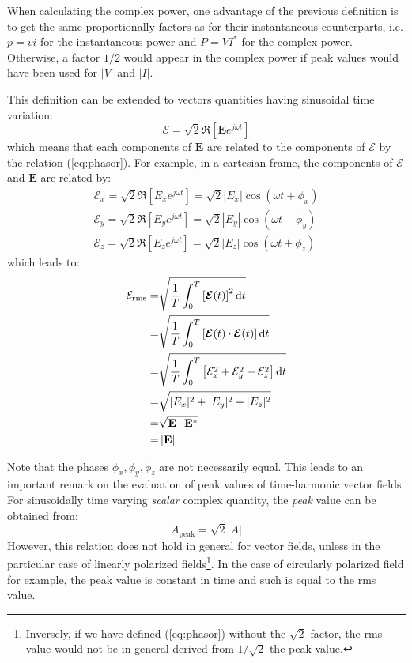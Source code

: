 When calculating the complex power, one advantage of the previous definition is to get the same proportionally factors as for their instantaneous counterparts, i.e. $p=v i$ for the instantaneous power and $P=VI^*$ for the complex power. Otherwise, a factor $1/2$ would appear in the complex power if peak values would have been used for $|V|$ and $|I|$.

This definition can be extended to vectors quantities having sinusoidal time variation:
\begin{equation}
 \boldsymbol{\mathcal{E}} = \sqrt{2} \Re \left[ \mathbf{E} e^{j\omega t}\right]
\end{equation}
which means that each components of $\mathbf{E}$ are related to the components of $ \boldsymbol{\mathcal{E}}$ by the relation (\ref{eq:phasor}). For example, in a cartesian frame, the components of $\boldsymbol{\mathcal{E}}$ and $\mathbf{E}$ are related by:
\begin{eqnarray*}
 \mathcal{E}_x = \sqrt{2} \Re \left[ E_x e^{j\omega t}\right] = \sqrt{2} |E_x| \cos (\omega t + \phi_x) \\
 \mathcal{E}_y = \sqrt{2} \Re \left[ E_y e^{j\omega t}\right] = \sqrt{2} |E_y| \cos (\omega t + \phi_y) \\
 \mathcal{E}_z = \sqrt{2} \Re \left[ E_z e^{j\omega t}\right] = \sqrt{2} |E_z| \cos (\omega t + \phi_z) 
\end{eqnarray*}
which leads to:
\begin{subequations}
 \begin{align}
  \mathcal{E}_{\mathrm{rms}} 
    =& \sqrt{\frac{1}{T} \int_0^T  \left[ \boldsymbol{\mathcal{E}}(t) \right]^2 \mathop{}\!\mathrm{d} t} \nonumber \\
    =& \sqrt{\frac{1}{T} \int_0^T  \left[ \boldsymbol{\mathcal{E}}(t) \cdot \boldsymbol{\mathcal{E}}(t) \right] \mathop{}\!\mathrm{d} t} \nonumber \\
    =& \sqrt{\frac{1}{T} \int_0^T  \left[ \mathcal{E}_x^2 + \mathcal{E}_y^2 + \mathcal{E}_z^2  \right] \mathop{}\!\mathrm{d} t} \nonumber \\
    =& \sqrt{|E_x|^2 + |E_y|^2 + |E_z|^2} \nonumber \\
    =& \sqrt{ \mathbf{E} \cdot \mathbf{E}^* } \nonumber \\
    =& \left| \mathbf{E} \right| \nonumber
 \end{align}
\end{subequations}

Note that the phases $\phi_x, \phi_y, \phi_z$ are not necessarily equal. This leads to an important remark on the evaluation of peak values of time-harmonic vector fields. For sinusoidally time varying \emph{scalar} complex quantity, the \emph{peak} value can be obtained from:
\begin{equation}
 A_{\mathrm{peak}} = \sqrt{2} |A|
\end{equation}
However, this relation does not hold in general for vector fields, unless in the particular case of linearly polarized fields\footnote{Inversely, if we have defined (\ref{eq:phasor}) without the $\sqrt{2}$ factor, the rms value would not be in general derived from $1/\sqrt{2}$ the peak value.}. In the case of circularly polarized field for example, the peak value is constant in time and such is equal to the rms value\parencite{Faria2008}.


